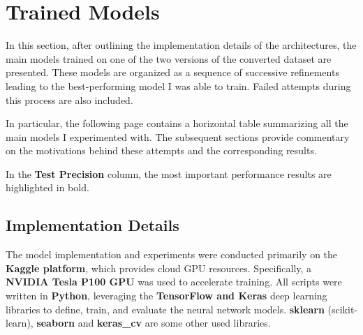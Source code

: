 \documentclass[a4paper,12pt]{article}
\begin{document}



\section{Trained Models}

In this section, after outlining the implementation details of the architectures, the main models trained on one of the two versions of the converted dataset are presented. These models are organized as a sequence of successive refinements leading to the best-performing model I was able to train. Failed attempts during this process are also included.

In particular, the following page contains a horizontal table summarizing all the main models I experimented with. The subsequent sections provide commentary on the motivations behind these attempts and the corresponding results.

In the \textbf{Test Precision} column, the most important performance results are highlighted in bold.


\subsection{Implementation Details}
The model implementation and experiments were conducted primarily on the \textbf{Kaggle platform}, which provides cloud GPU resources. Specifically, a \textbf{NVIDIA Tesla P100 GPU} was used to accelerate training. All scripts were written in \textbf{Python}, leveraging the \textbf{TensorFlow and Keras} deep learning libraries to define, train, and evaluate the neural network models. \textbf{sklearn} (scikit-learn), \textbf{seaborn} and \textbf{keras\_cv} are some other used libraries. 


\end{document}
